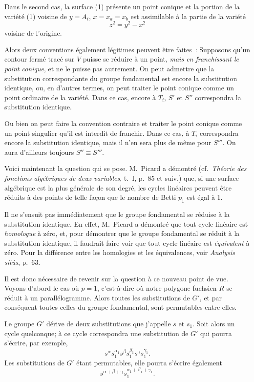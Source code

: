 \documentclass{article}
\begin{document}

Dans le second cas, la surface (1) présente un point conique et la portion de la variété (1) voisine de $y = A_{i}$, $x = x_{a} = x_{b}$ est assimilable à la partie de la variété
\[ z^{2} = y^{2} - x^{2} \]
voisine de l'origine.

Alors deux conventions également légitimes peuvent être faites~: Supposons qu'un contour fermé tracé sur $V$ puisse se réduire à un point, \emph{mais en franchissant le point conique}, et ne le puisse pas autrement. On peut admettre que la substitution correspondante du groupe fondamental est encore la substitution identique, ou, en d'autres termes, on peut traiter le point conique comme un point ordinaire de la variété. Dans ce cas, encore à $T_{i}$, $S'$ et $S''$ correspondra la substitution identique.

Ou bien on peut faire la convention contraire et traiter le point conique comme un point singulier qu'il est interdit de franchir. Dans ce cas, à $T_{i}$ correspondra encore la substitution identique, mais il n'en sera plus de même pour $S'''$. On aura d'ailleurs toujours $S'' \equiv S'''$.

Voici maintenant la question qui se pose. M.~Picard a démontré (cf.\ \emph{Théorie des fonctions algébriques de deux variables}, t.\ I, p.\ 85 et suiv.) que, si une surface algébrique est la plus générale de son degré, les cycles linéaires peuvent être réduits à des points de telle façon que le nombre de Betti $p_{1}$ est égal à 1.

Il ne s'ensuit pas immédiatement que le groupe fondamental se réduise à la substitution identique. En effet, M.~Picard a démontré que tout cycle linéaire est \emph{homologue} à zéro, et, pour démontrer que le groupe fondamental se réduit à la substitution identique, il faudrait faire voir que tout cycle linéaire est \emph{équivalent} à zéro. Pour la différence entre les homologies et les équivalences, voir \emph{Analysis sitûs}, p.\ 63.

Il est donc nécessaire de revenir sur la question à ce nouveau point de vue. Voyons d'abord le cas où $p = 1$, c'est-à-dire où notre polygone fuchsien $R$ se réduit à un parallélogramme. Alors toutes les substitutions de $G'$, et par conséquent toutes celles du groupe fondamental, sont permutables entre elles.

Le groupe $G'$ dérive de deux substitutions que j'appelle $s$ et $s_{1}$. Soit alors un cycle quelconque; à ce cycle correspondra une substitution
de $G'$ qui pourra s'écrire, par exemple,
\[ s^{\alpha} s^{\alpha_{1}}_{1} s^{\beta} s^{\beta_{1}}_{1} s^{\gamma} s^{\gamma_{1}}_{1}. \]
Les substitutions de $G'$ étant permutables, elle pourra s'écrire également
\[ s^{\alpha+\beta+\gamma} s^{\alpha_{1}+\beta_{1}+\gamma_{1}}_{1}. \]
\end{document}
